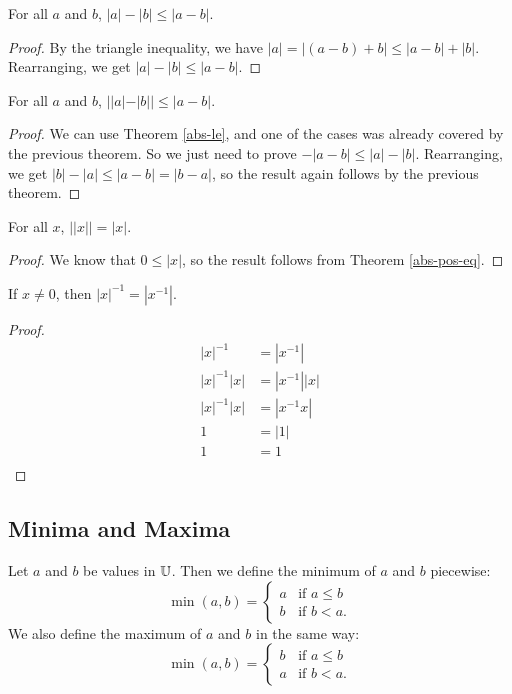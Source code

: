 \documentclass[../math.tex]{subfiles}
\begin{document}
\begin{theorem}
    For all $a$ and $b$, $|a| - |b| \leq |a - b|$.
\end{theorem}
\begin{proof}
    By the triangle inequality, we have $|a| = |(a - b) + b| \leq |a - b| +
    |b|$.  Rearranging, we get $|a| - |b| \leq |a - b|$.
\end{proof}

\begin{theorem}
    For all $a$ and $b$, $||a| - |b|| \leq |a - b|$.
\end{theorem}
\begin{proof}
    We can use Theorem \ref{abs-le}, and one of the cases was already covered by
    the previous theorem.  So we just need to prove $-|a - b| \leq |a| - |b|$.
    Rearranging, we get $|b| - |a| \leq |a - b| = |b - a|$, so the result again
    follows by the previous theorem.
\end{proof}

\begin{theorem}
    For all $x$, $||x|| = |x|$.
\end{theorem}
\begin{proof}
    We know that $0 \leq |x|$, so the result follows from Theorem
    \ref{abs-pos-eq}.
\end{proof}

\begin{theorem}
    If $x \neq 0$, then $|x|^{-1} = |x^{-1}|$.
\end{theorem}
\begin{proof}
    \begin{align*}
        |x|^{-1} &= |x^{-1}| \\
        |x|^{-1} |x| &= |x^{-1}| |x| \\
        |x|^{-1} |x| &= |x^{-1}x| \\
        1 &= |1| \\
        1 &= 1 \\
    \end{align*}
\end{proof}

\subsection{Minima and Maxima}

\begin{definition}
    Let $a$ and $b$ be values in $\mathbb{U}$.  Then we define the minimum of $a$ and
    $b$ piecewise:
    \[
        \min(a, b) = \begin{cases}
            a & \text{if $a \leq b$} \\
            b & \text{if $b < a$.}
        \end{cases}
    \]
    We also define the maximum of $a$ and $b$ in the same way:
    \[
        \min(a, b) = \begin{cases}
            b & \text{if $a \leq b$} \\
            a & \text{if $b < a$.}
        \end{cases}
    \]
\end{definition}
\end{document}
